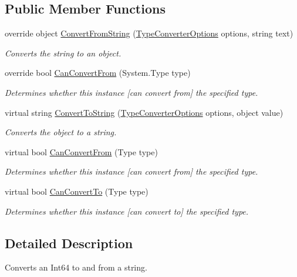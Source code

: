 \subsection*{Public Member Functions}
\begin{DoxyCompactItemize}
\item 
override object \hyperlink{a00116_a9080b7b6a5abc7d8271ffb6924c31b7c}{Convert\-From\-String} (\hyperlink{a00156}{Type\-Converter\-Options} options, string text)
\begin{DoxyCompactList}\small\item\em Converts the string to an object. \end{DoxyCompactList}\item 
override bool \hyperlink{a00116_a1aec0ff8b13f9f61240ecf2a337a6340}{Can\-Convert\-From} (System.\-Type type)
\begin{DoxyCompactList}\small\item\em Determines whether this instance \mbox{[}can convert from\mbox{]} the specified type. \end{DoxyCompactList}\item 
virtual string \hyperlink{a00084_a36cb2f9b24f15a671293f3a722324c27}{Convert\-To\-String} (\hyperlink{a00156}{Type\-Converter\-Options} options, object value)
\begin{DoxyCompactList}\small\item\em Converts the object to a string. \end{DoxyCompactList}\item 
virtual bool \hyperlink{a00084_a470d21adaa704eb281250dbd112ff91a}{Can\-Convert\-From} (Type type)
\begin{DoxyCompactList}\small\item\em Determines whether this instance \mbox{[}can convert from\mbox{]} the specified type. \end{DoxyCompactList}\item 
virtual bool \hyperlink{a00084_acb65bd8c8199d88d5b1629ae35d18514}{Can\-Convert\-To} (Type type)
\begin{DoxyCompactList}\small\item\em Determines whether this instance \mbox{[}can convert to\mbox{]} the specified type. \end{DoxyCompactList}\end{DoxyCompactItemize}


\subsection{Detailed Description}
Converts an Int64 to and from a string. 



